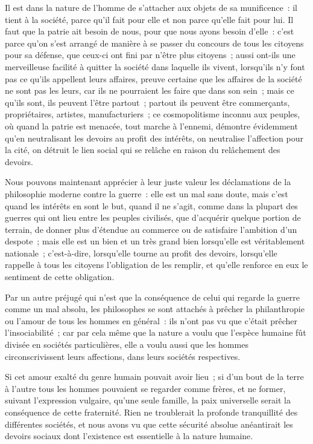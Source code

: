\documentclass[french,twoside]{book} %
\begin{document}
Il est dans la nature de l’homme de s’attacher aux objets de sa munificence : il tient à la société, parce qu’il fait pour elle et non parce qu’elle fait pour lui. Il faut que la patrie ait besoin de nous, pour que nous ayons besoin d’elle : c’est parce qu’on s’est arrangé de manière à se passer du concours de tous les citoyens pour sa défense, que ceux-ci ont fini par n’être plus citoyens ; aussi ont-ils une merveilleuse facilité à quitter la société dans laquelle ils vivent, lorsqu’ils n’y font pas ce qu’ils appellent leurs affaires, preuve certaine que les affaires de la société ne sont pas les leurs, car ils ne pourraient les faire que dans son sein ; mais ce qu’ils sont, ils peuvent l’être partout ; partout ils peuvent être commerçants, propriétaires, artistes, manufacturiers ; ce cosmopolitisme inconnu aux peuples, où quand la patrie est menacée, tout marche à l’ennemi, démontre évidemment qu’en neutralisant les devoirs au profit des intérêts, on neutralise l’affection pour la cité, on détruit le lien social qui se relâche en raison du relâchement des devoirs.\par
Nous pouvons maintenant apprécier à leur juste valeur les déclamations de la philosophie moderne contre la guerre : elle est un mal sans doute, mais c’est quand les intérêts en sont le but, quand il ne s’agit, comme dans la plupart des guerres qui ont lieu entre les peuples civilisés, que d’acquérir quelque portion de terrain, de donner plus d’étendue au commerce ou de satisfaire l’ambition d’un despote ; mais elle est un bien et un très grand bien lorsqu’elle est véritablement nationale ; c’est-à-dire, lorsqu’elle tourne au profit des devoirs, lorsqu’elle rappelle à tous les citoyens l’obligation de les remplir, et qu’elle renforce en eux le sentiment de cette obligation.\par
Par un autre préjugé qui n’est que la conséquence de celui qui regarde la guerre comme un mal absolu, les philosophes se sont attachés à prêcher la philanthropie ou l’amour de tous les hommes en général : ils n’ont pas vu que c’était prêcher l’insociabilité ; car par cela même que la nature a voulu que l’espèce humaine fût divisée en sociétés particulières, elle a voulu aussi que les hommes circonscrivissent leurs affections, dans leurs sociétés respectives.\par
Si cet amour exalté du genre humain pouvait avoir lieu ; si d’un bout de la terre à l’autre tous les hommes pouvaient se regarder comme frères, et ne former, suivant l’expression vulgaire, qu’une seule famille, la paix universelle serait la conséquence de cette fraternité. Rien ne troublerait la profonde tranquillité des différentes sociétés, et nous avons vu que cette sécurité absolue anéantirait les devoirs sociaux dont l’existence est essentielle à la nature humaine.\par
\end{document}
